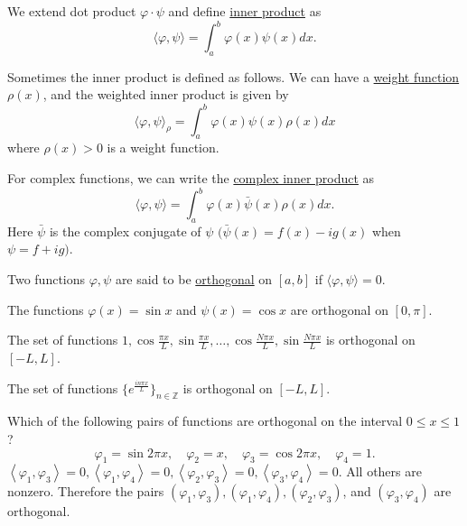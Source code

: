 \begin{definition} We extend dot product $\varphi \cdot \psi$ and define \underline{inner product} as
\begin{equation}\label{eq.inner_product}
    \langle\varphi, \psi\rangle=\int_a^b \varphi(x) \psi(x) d x .
\end{equation}
    
Sometimes the inner product is defined as follows. We can have a \underline{weight function} $\rho(x)$, and the weighted inner product is given by
\begin{equation}\label{eq.inner_product_weight}
    \langle\varphi, \psi\rangle_\rho=\int_a^b \varphi(x) \psi(x) \rho(x) d x
\end{equation}
where $\rho(x)>0$ is a weight function. 

For complex functions, we can write the \underline{complex inner product} as
\begin{equation}\label{eq.inner_product_complex}
    \langle\varphi, \psi\rangle=\int_a^b \varphi(x) \bar{\psi}(x) \rho(x) d x .
\end{equation}
Here $\bar{\psi}$ is the complex conjugate of $\psi$ $(\bar{\psi}(x)=f(x)-i g(x)$ when $\psi=f+i g)$.
    
\end{definition}

\begin{definition}[Orthogonality]
Two functions $\varphi, \psi$ are said to be \underline{orthogonal} on $[a, b]$ if $\langle\varphi, \psi\rangle=0$.    
\end{definition}

\begin{example}[]
    The functions $\varphi(x)=\sin x$ and $\psi(x)=\cos x$ are orthogonal on $[0, \pi]$.
\end{example}
\begin{example}[]
    The set of functions $1, \cos \frac{\pi x}{L}, \sin \frac{\pi x}{L}, \ldots, \cos \frac{N\pi x}{L}, \sin \frac{N\pi x}{L}$ is orthogonal on $[-L, L]$.
\end{example}

\begin{example}[]
    The set of functions $\{e^{\frac{in\pi x}{L}}\}_{n\in\mathbb{Z}}$ is orthogonal on $[-L, L]$.
\end{example}

\begin{example}[]
    Which of the following pairs of functions are orthogonal on the interval $0 \leq x \leq 1$?
$$
\varphi_1=\sin 2 \pi x, \quad \varphi_2=x, \quad \varphi_3=\cos 2 \pi x, \quad \varphi_4=1 .
$$
$\left\langle\varphi_1, \varphi_3\right\rangle=0,\left\langle\varphi_1, \varphi_4\right\rangle=0,\left\langle\varphi_2, \varphi_3\right\rangle=0,\left\langle\varphi_3, \varphi_4\right\rangle=0$. All others are nonzero. Therefore the pairs $\left(\varphi_1, \varphi_3\right),\left(\varphi_1, \varphi_4\right),\left(\varphi_2, \varphi_3\right)$, and $\left(\varphi_3, \varphi_4\right)$ are orthogonal.
\end{example}

